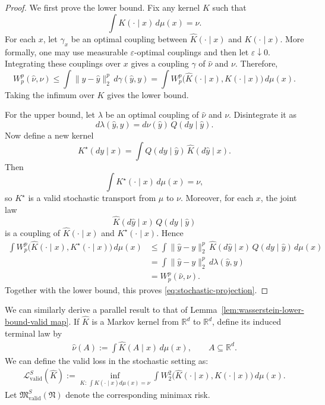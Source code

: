 \documentclass[11pt,twoside]{article}
\newcommand{\lvalids}{\mathcal{L}^S_{\text{valid}}}
\newcommand{\targetclass}{\mathfrak{N}}
\newcommand{\validsminimaxrisk}{\mathfrak{M}^S_{\text{valid}}}
\begin{document}
\begin{proof}
We first prove the lower bound. Fix any kernel $K$ such that
\[
\int K(\cdot\mid x)\,d\mu(x)=\nu.
\]
For each $x$, let $\gamma_x$ be an optimal coupling between $\widehat{K}(\cdot\mid x)$ and $K(\cdot\mid x)$. More formally, one may use measurable $\varepsilon$-optimal couplings and then let $\varepsilon\downarrow 0$. Integrating these couplings over $x$ gives a coupling $\gamma$ of $\widehat{\nu}$ and $\nu$. Therefore,
\[
W_p^p(\widehat{\nu},\nu)
\leq
\int \|y-\widehat{y}\|_2^p\,d\gamma(\widehat{y},y)
=
\int W_p^p\bigl(\widehat{K}(\cdot\mid x),K(\cdot\mid x)\bigr)\,d\mu(x).
\]
Taking the infimum over $K$ gives the lower bound.

For the upper bound, let $\lambda$ be an optimal coupling of $\widehat{\nu}$ and $\nu$. Disintegrate it as
\[
d\lambda(\widehat{y},y)
=
d\widehat{\nu}(\widehat{y})\,Q(dy\mid \widehat{y}).
\]
Now define a new kernel
\[
K^\star(dy\mid x)
=
\int Q(dy\mid \widehat{y})\,\widehat{K}(d\widehat{y}\mid x).
\]
Then
\[
\int K^\star(\cdot\mid x)\,d\mu(x)=\nu,
\]
so $K^\star$ is a valid stochastic transport from $\mu$ to $\nu$. Moreover, for each $x$, the joint law
\[
\widehat{K}(d\widehat{y}\mid x)\,Q(dy\mid \widehat{y})
\]
is a coupling of $\widehat{K}(\cdot\mid x)$ and $K^\star(\cdot\mid x)$. Hence
\begin{align*}
\int W_p^p\bigl(\widehat{K}(\cdot\mid x),K^\star(\cdot\mid x)\bigr)\,d\mu(x)
&\leq
\int \|\widehat{y}-y\|_2^p
\,\widehat{K}(d\widehat{y}\mid x)\,Q(dy\mid \widehat{y})\,d\mu(x) \\
&=
\int \|\widehat{y}-y\|_2^p\,d\lambda(\widehat{y},y) \\
&=
W_p^p(\widehat{\nu},\nu).
\end{align*}
Together with the lower bound, this proves \eqref{eq:stochastic-projection}.
\end{proof}




We can similarly derive a parallel result to that of Lemma~\ref{lem:wasserstein-lower-bound-valid map}. 
If $\widehat K$ is a Markov kernel from $\mathbb R^d$ to $\mathbb R^d$, define its induced terminal law by
\begin{align*}
\widehat\nu(A):=\int \widehat K(A\mid x)\,d\mu(x),
\qquad A\subseteq\mathbb R^d.
\end{align*}
We can define the valid loss in the stochastic setting as:
\begin{align*}
\lvalids(\widehat{K})
:=
\inf_{K:\,\int K(\cdot\mid x)d\mu(x)=\nu}
\int W_2^2\bigl(\widehat K(\cdot\mid x),K(\cdot\mid x)\bigr)\,d\mu(x).
\end{align*}
Let $\validsminimaxrisk(\targetclass)$ denote the corresponding minimax risk.
\end{document}
